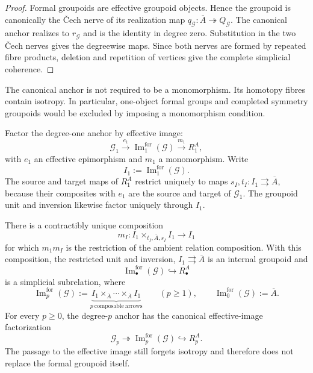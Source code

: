 \begin{proof}
Formal groupoids are effective groupoid objects.  Hence the groupoid is canonically
the \v{C}ech nerve of its realization map
$q_{\mathcal G}:\overline A\twoheadrightarrow Q_{\mathcal G}$.
The canonical anchor realizes to $r_{\mathcal G}$ and is the identity in degree
zero.  Substitution in the two \v{C}ech nerves gives the degreewise maps.  Since
both nerves are formed by repeated fibre products, deletion and repetition of
vertices give the complete simplicial coherence.
\end{proof}

\begin{remark}
\label{rem:symmetry-noether-not-a-monomorphism}
The canonical anchor is not required to be a monomorphism.  Its homotopy fibres
contain isotropy.  In particular, one-object formal groups and completed symmetry
groupoids would be excluded by imposing a monomorphism condition.
\end{remark}

\begin{construction}
\label{constr:symmetry-noether-effective-infinitesimal-arrow-image}
Factor the degree-one anchor by effective image:
\[
\mathcal G_1
\xrightarrow{e_1}
\operatorname{Im}^{\mathrm{for}}_1(\mathcal G)
\xrightarrow{m_1}
R^A_1,
\]
with $e_1$ an effective epimorphism and $m_1$ a monomorphism.  Write
\[
I_1:=\operatorname{Im}^{\mathrm{for}}_1(\mathcal G).
\]
The source and target maps of $R^A_1$ restrict uniquely to maps
$s_I,t_I:I_1\rightrightarrows\overline A$, because their composites with $e_1$
are the source and target of $\mathcal G_1$.  The groupoid unit and inversion
likewise factor uniquely through $I_1$.
\end{construction}

\begin{theorem}
\label{thm:symmetry-noether-effective-arrow-image-is-an-infinitesimal-subrelation}
There is a contractibly unique composition
\[
m_I:
I_1\times_{t_I,\overline A,s_I}I_1
\longrightarrow I_1
\]
for which $m_1m_I$ is the restriction of the ambient relation composition.  With
this composition, the restricted unit and inversion, $I_1\rightrightarrows\overline A$
is an internal groupoid and
\[
\operatorname{Im}^{\mathrm{for}}_\bullet(\mathcal G)
\hookrightarrow R^A_\bullet
\]
is a simplicial subrelation, where
\[
\operatorname{Im}^{\mathrm{for}}_p(\mathcal G)
:=
\underbrace{
I_1\times_{\overline A}\cdots\times_{\overline A}I_1
}_{p\ \mathrm{composable\ arrows}}
\qquad (p\ge1),
\qquad
\operatorname{Im}^{\mathrm{for}}_0(\mathcal G):=\overline A.
\]
For every $p\ge0$, the degree-$p$ anchor has the canonical effective-image
factorization
\[
\mathcal G_p\twoheadrightarrow
\operatorname{Im}^{\mathrm{for}}_p(\mathcal G)
\hookrightarrow R^A_p.
\]
The passage to the effective image still forgets isotropy and therefore does not
replace the formal groupoid itself.
\end{theorem}


